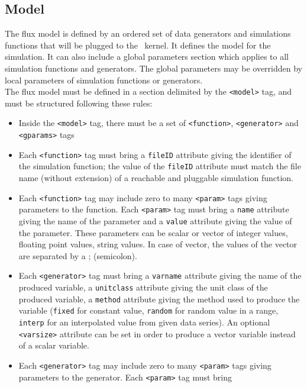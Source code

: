 \subsection{Model}

The flux model is defined by an ordered set of data generators and simulations
functions that will be plugged to the \OFEname \ kernel. It defines the model
for the simulation. It can also include a global parameters section which
applies to all simulation functions and generators. The global parameters may
be overridden by local parameters of simulation functions or generators.\\
\noindent The flux model must be defined in a section delimited by the
\texttt{<model>} tag, and must be structured following these rules:
\begin{itemize}
  \item Inside the \texttt{<model>} tag, there must be a set of
  \texttt{<function>}, \texttt{<generator>} and \texttt{<gparams>} tags
  \item Each \texttt{<function>} tag must bring a \texttt{fileID} attribute giving
  the identifier of the simulation function; the value of the \texttt{fileID}
  attribute must match the file name (without extension) of a reachable and
  pluggable simulation function.
  \item Each \texttt{<function>} tag may include zero to many \texttt{<param>} tags giving
  parameters to the function. Each \texttt{<param>} tag must bring a \texttt{name} attribute giving
  the name of the parameter and a \texttt{value} attribute giving the value of the parameter. These parameters can be scalar or vector of integer values, floating point values, string values. In case of vector, the values of the vector are separated by a ; (semicolon).
  \item Each \texttt{<generator>} tag must bring a \texttt{varname} attribute giving 
  the name of the produced variable, a \texttt{unitclass} attribute giving the 
  unit class of the produced variable, a \texttt{method} attribute giving the 
  method used to produce the variable (\texttt{fixed} for constant value,
  \texttt{random} for random value in a range, \texttt{interp} for an
  interpolated value from given data series). An optional \texttt{<varsize>}
  attribute can be set in order to produce a vector variable instead of a scalar variable.
  \item Each \texttt{<generator>} tag may include zero to many \texttt{<param>}
  tags giving parameters to the generator. Each \texttt{<param>} tag must bring

\end{itemize}
